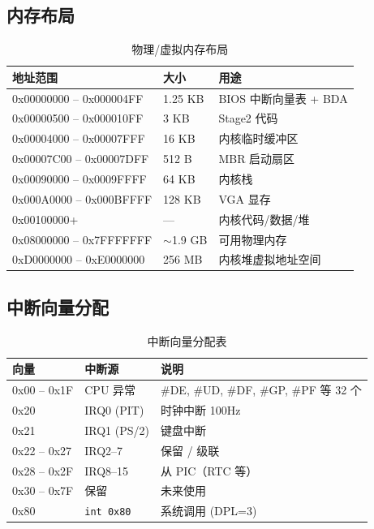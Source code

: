 \documentclass[12pt,a4paper]{article}
\begin{document}
\subsection{内存布局}

\begin{table}[h]
\centering
\begin{tabular}{lll}
\toprule
\textbf{地址范围} & \textbf{大小} & \textbf{用途} \\
\midrule
0x00000000 -- 0x000004FF & 1.25 KB & BIOS 中断向量表 + BDA \\
0x00000500 -- 0x000010FF & 3 KB    & Stage2 代码 \\
0x00004000 -- 0x00007FFF & 16 KB   & 内核临时缓冲区 \\
0x00007C00 -- 0x00007DFF & 512 B   & MBR 启动扇区 \\
0x00090000 -- 0x0009FFFF & 64 KB   & 内核栈 \\
0x000A0000 -- 0x000BFFFF & 128 KB  & VGA 显存 \\
0x00100000+              & ---     & 内核代码/数据/堆 \\
0x08000000 -- 0x7FFFFFFF & $\sim$1.9 GB & 可用物理内存 \\
0xD0000000 -- 0xE0000000 & 256 MB  & 内核堆虚拟地址空间 \\
\bottomrule
\end{tabular}
\caption{物理/虚拟内存布局}
\end{table}

\subsection{中断向量分配}

\begin{table}[h]
\centering
\begin{tabular}{lll}
\toprule
\textbf{向量} & \textbf{中断源} & \textbf{说明} \\
\midrule
0x00 -- 0x1F & CPU 异常 & \#DE, \#UD, \#DF, \#GP, \#PF 等 32 个 \\
0x20 & IRQ0 (PIT) & 时钟中断 100Hz \\
0x21 & IRQ1 (PS/2) & 键盘中断 \\
0x22 -- 0x27 & IRQ2--7 & 保留 / 级联 \\
0x28 -- 0x2F & IRQ8--15 & 从 PIC（RTC 等）\\
0x30 -- 0x7F & 保留 & 未来使用 \\
0x80 & \texttt{int 0x80} & 系统调用 (DPL=3) \\
\bottomrule
\end{tabular}
\caption{中断向量分配表}
\end{table}
\end{document}
